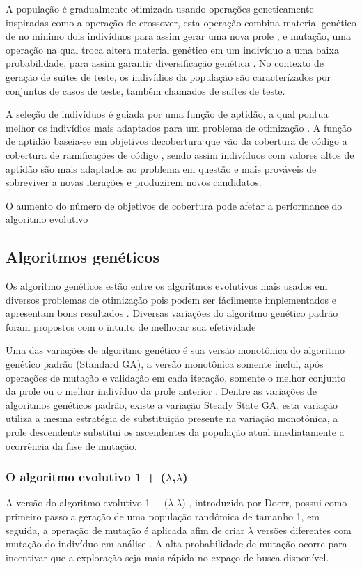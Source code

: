 \documentclass[
	12pt,				%
	oneside,			%
	a4paper,			%
	english,			%
	brazil				%
	]{abntex2ppgsi}
\begin{document}
A população é gradualmente otimizada usando operações geneticamente inspiradas como a operação de crossover, esta operação combina material genético de no mínimo dois indivíduos para assim gerar uma nova prole , e mutação, uma operação na qual troca altera material genético em um indivíduo a uma baixa probabilidade, para assim garantir diversificação genética \cite{Campos2017}. No contexto de geração de suítes de teste, os indivídios da população são caracterízados por conjuntos de casos de teste, também chamados de suítes de teste. \cite{Campos2017}


A seleção de indivíduos é guiada por uma função de aptidão, a qual pontua melhor  os indivídios mais adaptados para um problema de otimização \cite{Campos2017}. A função de aptidão baseia-se em objetivos decobertura que vão da cobertura de código a cobertura de ramificações de código \cite{Campos2017}, sendo assim indivíduos com valores altos de aptidão são mais adaptados ao problema em questão e mais prováveis de sobreviver a novas iterações e produzirem novos candidatos. \cite{Campos2017}

O aumento do número de objetivos de cobertura pode afetar a performance do algoritmo evolutivo \cite{Campos2017}

\subsection{Algoritmos genéticos}

Os algoritmo genéticos estão entre os algoritmos evolutivos mais usados em diversos problemas de otimização pois podem ser fácilmente implementados e apresentam bons resultados  \cite{Campos2017}. Diversas variações do algoritmo genético padrão foram propostos com o intuito de melhorar sua efetividade \cite{Campos2017}

Uma das variações de algoritmo genético é sua versão monotônica do algoritmo genético padrão (Standard GA), a versão monotônica somente inclui, após operações de mutação e validação em cada iteração, somente o melhor conjunto da prole ou o melhor indivíduo da prole anterior \cite{Campos2017}.  Dentre as variações de algoritmos genéticos padrão, existe a variação Steady State GA, esta variação utiliza a mesma estratégia de substituição presente na variação monotônica, a prole descendente substitui os ascendentes da população atual imediatamente a ocorrência da fase de mutação.  \cite{Campos2017}


\subsubsection{O algoritmo evolutivo 1 + ($\lambda$,$\lambda$)}
A versão do algoritmo evolutivo 1 + ($\lambda$,$\lambda$) , introduzida por Doerr, possui como primeiro passo a geração de uma população randômica de tamanho 1, em seguida, a operação de mutação é aplicada afim de criar $\lambda$ versões diferentes com mutação do indivíduo em análise \cite{Campos2017}. A alta probabilidade de mutação ocorre para incentivar que a exploração seja mais rápida no expaço de busca disponível. \cite{Campos2017}
\end{document}

